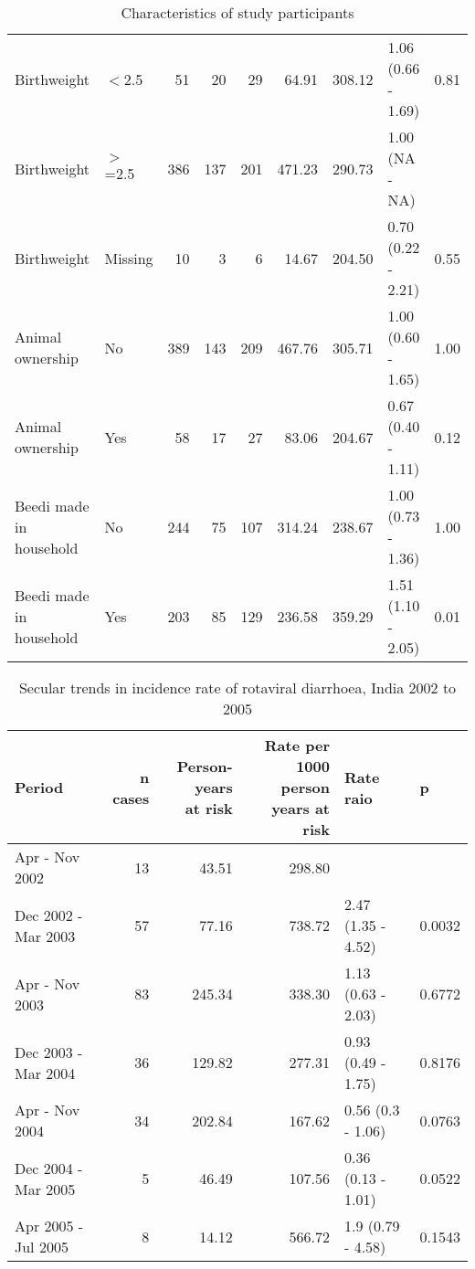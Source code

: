 \documentclass[11pt,a4paper,twoside]{article}\usepackage{graphicx, color}
\begin{document}
\begin{sidewaystable}[ht]
\begin{tabular}{llrrrrrlr}
  Birthweight & $<$2.5 & 51 & 20 & 29 & 64.91 & 308.12 & 1.06 (0.66 - 1.69) & 0.81 \\ 
  Birthweight & $>$=2.5 & 386 & 137 & 201 & 471.23 & 290.73 & 1.00 (NA - NA) &  \\ 
  Birthweight & Missing & 10 & 3 & 6 & 14.67 & 204.50 & 0.70 (0.22 - 2.21) & 0.55 \\ 
  Animal ownership & No & 389 & 143 & 209 & 467.76 & 305.71 & 1.00 (0.60 - 1.65) & 1.00 \\ 
  Animal ownership & Yes & 58 & 17 & 27 & 83.06 & 204.67 & 0.67 (0.40 - 1.11) & 0.12 \\ 
  Beedi made in household & No & 244 & 75 & 107 & 314.24 & 238.67 & 1.00 (0.73 - 1.36) & 1.00 \\ 
  Beedi made in household & Yes & 203 & 85 & 129 & 236.58 & 359.29 & 1.51 (1.10 - 2.05) & 0.01 \\ 
   \bottomrule
\end{tabular}
\caption{Characteristics of study participants} 
\label{epic}
\end{sidewaystable}



\begin{table}[ht]
\centering
\begin{tabular}{lrrrll}
  \toprule
Period & n cases & \shortstack{Person-years \\at risk} & \shortstack{Rate per 1000 \\person years at risk} & Rate raio & p \\ 
  \midrule
Apr - Nov 2002 & 13 & 43.51 & 298.80 &  &  \\ 
  Dec 2002 - Mar 2003 & 57 & 77.16 & 738.72 & 2.47 (1.35 - 4.52) & 0.0032 \\ 
  Apr - Nov 2003 & 83 & 245.34 & 338.30 & 1.13 (0.63 - 2.03) & 0.6772 \\ 
  Dec 2003 - Mar 2004 & 36 & 129.82 & 277.31 & 0.93 (0.49 - 1.75) & 0.8176 \\ 
  Apr - Nov 2004 & 34 & 202.84 & 167.62 & 0.56 (0.3 - 1.06) & 0.0763 \\ 
  Dec 2004 - Mar 2005 & 5 & 46.49 & 107.56 & 0.36 (0.13 - 1.01) & 0.0522 \\ 
  Apr 2005 - Jul 2005 & 8 & 14.12 & 566.72 & 1.9 (0.79 - 4.58) & 0.1543 \\ 
   \bottomrule
\end{tabular}
\caption{Secular trends in incidence rate of rotaviral diarrhoea, India 2002 to 2005} 
\label{trend}
\end{table}
\end{document}
